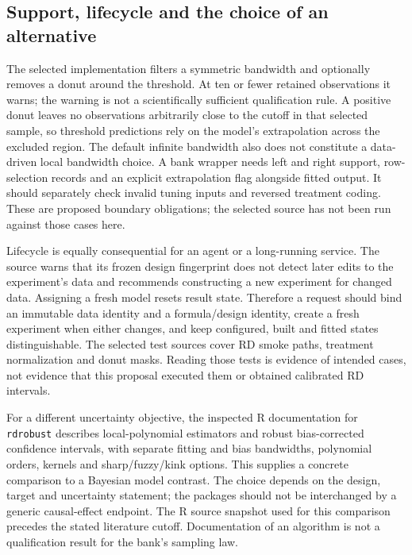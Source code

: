 \subsection{Support, lifecycle and the choice of an alternative}

The selected implementation filters a symmetric bandwidth and optionally removes
a donut around the threshold. At ten or fewer retained observations it warns;
the warning is not a scientifically sufficient qualification rule. A positive
donut leaves no observations arbitrarily close to the cutoff in that selected
sample, so threshold predictions rely on the model's extrapolation across the
excluded region. The default infinite bandwidth also does not constitute a
data-driven local bandwidth choice. A bank wrapper needs left and right support,
row-selection records and an explicit extrapolation flag alongside fitted output.
It should separately check invalid tuning inputs and reversed treatment coding.
These are proposed boundary obligations; the selected source has not been run
against those cases here.~\citep{exec14_causalpy_primary,exec14_causalpy_decision}

Lifecycle is equally consequential for an agent or a long-running service. The
source warns that its frozen design fingerprint does not detect later edits to
the experiment's data and recommends constructing a new experiment for changed
data. Assigning a fresh model resets result state. Therefore a request should bind
an immutable data identity and a formula/design identity, create a fresh experiment
when either changes, and keep configured, built and fitted states distinguishable.
The selected test sources cover RD smoke paths, treatment normalization and donut
masks. Reading those tests is evidence of intended cases, not evidence that this
proposal executed them or obtained calibrated RD intervals.
\citep{exec14_causalpy_primary}

For a different uncertainty objective, the inspected R documentation for
\texttt{rdrobust} describes local-polynomial estimators and robust bias-corrected
confidence intervals, with separate fitting and bias bandwidths, polynomial
orders, kernels and sharp/fuzzy/kink options. This supplies a concrete comparison
to a Bayesian model contrast. The choice depends on the design, target and
uncertainty statement; the packages should not be interchanged by a generic
causal-effect endpoint. The R source snapshot used for this comparison
precedes the stated literature cutoff. Documentation of an algorithm is not a
qualification result for the bank's sampling law.~\citep{v12_sw_rdrobust}

